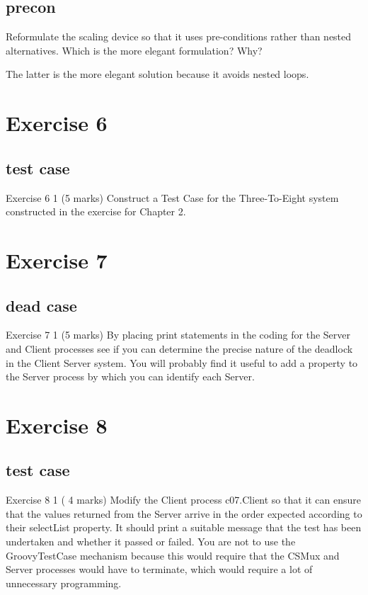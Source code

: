 \documentclass[10pt, a4paper]{article}
\begin{document}
	
	\subsection{precon}
      Reformulate the scaling device so that it uses pre-conditions rather than nested alternatives.  Which is the more elegant formulation? Why?
   
   The latter is the more elegant solution because it avoids nested loops.
   
   	\setcounter{section}{6}
   \section*{Exercise 6}
   
   \setcounter{subsection}{0}
   \subsection{test case}
      Exercise 6 1   (5 marks)
   Construct a Test Case for the Three-To-Eight system constructed in  the  exercise for Chapter 2.  
   
   	\setcounter{section}{7}
	\section*{Exercise 7}
	
	
	\setcounter{subsection}{0}
	\subsection{dead case}
	   Exercise 7 1   (5 marks)
	By placing print statements in the coding for the Server and Client processes see if you can determine the precise nature of the deadlock in the Client Server system.  You will probably find it useful to add a property to the Server process by which you can identify each Server.  


	\setcounter{section}{8}
   \section*{Exercise 8}
   
   \setcounter{subsection}{0}
   \subsection{test case}

   Exercise 8 1   ( 4 marks)
   Modify the Client process c07.Client so that it can ensure that the values returned from the Server arrive in the order expected according to their selectList property.  It should print a suitable message that the test has been undertaken and whether it passed or failed.  You are not to use the GroovyTestCase mechanism because this would require that the CSMux and Server processes would have to terminate, which would require a lot of unnecessary programming.  
   
\end{document}
